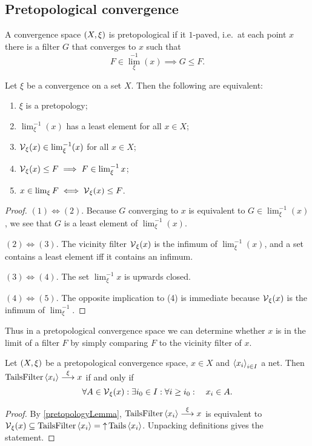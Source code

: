 \subsection{Pretopological convergence}
A convergence space $\left( X,\xi \right)$ is pretopological if it $1$-paved, i.e.\ at each point $x$ there is a filter $G$ that converges to $x$ such that
\[ F\in {\lim}_\xi^{-1}(x) \implies G \leq F. \]

\begin{lemma} \label{pretopologyLemma}
Let $\xi$ be a convergence on a set $X$. Then the following are equivalent:
\begin{enumerate}
\item $\xi$ is a pretopology;
\item $\lim_\xi^{-1}(x)$ has a least element for all $x\in X$;
\item $\operatorname{\mathcal{V}}_\xi(x) \in \lim_\xi^{-1}(x)$ for all $x\in X$;
\item $\operatorname{\mathcal{V}}_\xi(x) \leq F \implies F\in\lim^{-1}_\xi x$;
\item $x\in\lim_\xi F \iff \operatorname{\mathcal{V}}_\xi(x) \leq F$.
\end{enumerate}
\end{lemma}
\begin{proof}
$(1) \Leftrightarrow (2)$. Because $G$ converging to $x$ is equivalent to $G\in \lim_\xi^{-1}(x)$, we see that $G$ is a least element of $\lim_\xi^{-1}(x)$.

$(2) \Leftrightarrow (3)$. The vicinity filter $\operatorname{\mathcal{V}}_\xi(x)$ is the infimum of $\lim_\xi^{-1}(x)$, and a set contains a least element iff it contains an infimum.

$(3) \Leftrightarrow (4)$. The set $\lim^{-1}_\xi x$ is upwards closed.

$(4) \Leftrightarrow (5)$. The opposite implication to (4) is immediate because $\operatorname{\mathcal{V}}_\xi(x)$ is the infimum of $\lim^{-1}_\xi$.
\end{proof}
Thus in a pretopological convergence space we can determine whether $x$ is in the limit of a filter $F$ by simply comparing $F$ to the vicinity filter of $x$.

\begin{lemma} \label{pretopologicalNetConvergence}
Let $\left( X,\xi \right)$ be a pretopological convergence space, $x\in X$ and $\left\langle x_i \right\rangle_{i\in I}$ a net. Then $\operatorname{TailsFilter}\left\langle x_i \right\rangle \overset{\xi}{\longrightarrow} x$ \textup{if and only if}
\[ \forall A\in \operatorname{\mathcal{V}}_\xi(x): \exists i_0\in I: \forall i \geq i_0: \quad x_i\in A. \]
\end{lemma}
\begin{proof}
By \ref{pretopologyLemma}, $\operatorname{TailsFilter}\left\langle x_i \right\rangle \overset{\xi}{\longrightarrow} x$ is equivalent to $\operatorname{\mathcal{V}}_\xi(x) \subseteq \operatorname{TailsFilter}\left\langle x_i \right\rangle = \operatorname{\uparrow} \operatorname{Tails}\left\langle x_i \right\rangle$. Unpacking definitions gives the statement.
\end{proof}

